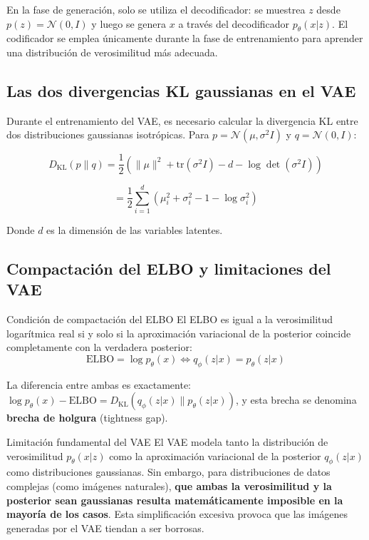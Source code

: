 En la fase de generación, solo se utiliza el decodificador: se muestrea $z$ desde $p(z) = \mathcal{N}(0, I)$ y luego se genera $x$ a través del decodificador $p_\theta(x|z)$. El codificador se emplea únicamente durante la fase de entrenamiento para aprender una distribución de verosimilitud más adecuada.

\subsection{Las dos divergencias KL gaussianas en el VAE}

Durante el entrenamiento del VAE, es necesario calcular la divergencia KL entre dos distribuciones gaussianas isotrópicas. Para $p = \mathcal{N}(\mu, \sigma^2 I)$ y $q = \mathcal{N}(0, I)$:

$$D_{\text{KL}}(p \| q) = \frac{1}{2} \left( \|\mu\|^2 + \text{tr}(\sigma^2 I) - d - \log \det(\sigma^2 I) \right)$$

$$= \frac{1}{2} \sum_{i=1}^{d} \left( \mu_i^2 + \sigma_i^2 - 1 - \log \sigma_i^2 \right)$$

Donde $d$ es la dimensión de las variables latentes.

\subsection{Compactación del ELBO y limitaciones del VAE}

\begin{importantbox}{Condición de compactación del ELBO}
El ELBO es igual a la verosimilitud logarítmica real si y solo si la aproximación variacional de la posterior coincide completamente con la verdadera posterior:
$$\text{ELBO} = \log p_\theta(x) \iff q_\phi(z|x) = p_\theta(z|x)$$

La diferencia entre ambas es exactamente: $\log p_\theta(x) - \text{ELBO} = D_{\text{KL}}(q_\phi(z|x) \| p_\theta(z|x))$, y esta brecha se denomina \textbf{brecha de holgura} (tightness gap).
\end{importantbox}

\begin{warningbox}{Limitación fundamental del VAE}
El VAE modela tanto la distribución de verosimilitud $p_\theta(x|z)$ como la aproximación variacional de la posterior $q_\phi(z|x)$ como distribuciones gaussianas. Sin embargo, para distribuciones de datos complejas (como imágenes naturales), \textbf{que ambas la verosimilitud y la posterior sean gaussianas resulta matemáticamente imposible en la mayoría de los casos}. Esta simplificación excesiva provoca que las imágenes generadas por el VAE tiendan a ser borrosas.
\end{warningbox}

